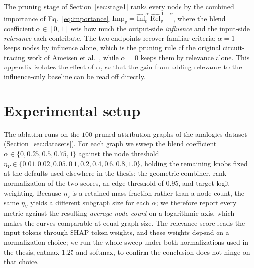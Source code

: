 \documentclass[../main.tex]{subfiles}
\begin{document}
The pruning stage of Section~\ref{sec:stage1} ranks every node by the combined
importance of Eq.~\eqref{eq:importance},
$\mathrm{Imp}_v = \widehat{\mathrm{Inf}}_v^{\,\alpha}\,\widehat{\mathrm{Rel}}_v^{\,1-\alpha}$,
where the blend coefficient $\alpha \in [0,1]$ sets how much the output-side
\emph{influence} and the input-side \emph{relevance} each contribute. The two
endpoints recover familiar criteria: $\alpha = 1$ keeps nodes by influence alone,
which is the pruning rule of the original circuit-tracing work of Ameisen et
al.~\cite{ameisen2025circuit}, while $\alpha = 0$ keeps them by relevance alone.
This appendix isolates the effect of $\alpha$, so that the gain from adding
relevance to the influence-only baseline can be read off directly.

\section{Experimental setup}
The ablation runs on the $100$ pruned attribution graphs of the analogies dataset
(Section~\ref{sec:datasets}). For each graph we sweep the blend coefficient
$\alpha \in \{0, 0.25, 0.5, 0.75, 1\}$ against the node threshold
$\eta_V \in \{0.01, 0.02, 0.05, 0.1, 0.2, 0.4, 0.6, 0.8, 1.0\}$, holding the
remaining knobs fixed at the defaults used elsewhere in the thesis: the geometric
combiner, rank normalization of the two scores, an edge threshold of $0.95$, and
target-logit weighting. Because $\eta_V$ is a retained-mass fraction rather than a
node count, the same $\eta_V$ yields a different subgraph size for each $\alpha$;
we therefore report every metric against the resulting \emph{average node count}
on a logarithmic axis, which makes the curves comparable at equal graph size. The
relevance score reads the input tokens through SHAP token weights, and these
weights depend on a normalization choice; we run the whole sweep under both
normalizations used in the thesis, entmax-$1.25$ and softmax, to confirm the
conclusion does not hinge on that choice.
\end{document}
